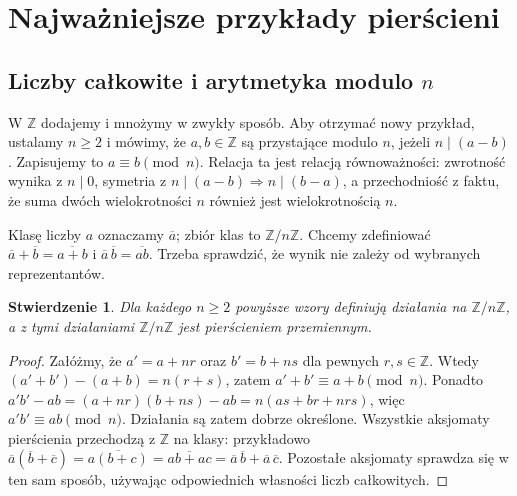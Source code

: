 \documentclass[11pt,a4paper,openany]{report}
\numberwithin{equation}{section}
\theoremstyle{plain}
\newtheorem{stwierdzenie}[twierdzenie]{Stwierdzenie}
\theoremstyle{definition}
\theoremstyle{remark}
\newcommand{\Z}{\mathbb Z}
\begin{document}
\section{Najważniejsze przykłady pierścieni}

\subsection{Liczby całkowite i arytmetyka modulo \texorpdfstring{$n$}{n}}

W $\Z$ dodajemy i mnożymy w zwykły sposób. Aby otrzymać nowy przykład,
ustalamy $n\ge2$ i mówimy, że $a,b\in\Z$ są przystające modulo $n$,
jeżeli $n\mid(a-b)$. Zapisujemy to $a\equiv b\pmod n$.
Relacja ta jest relacją równoważności: zwrotność wynika z $n\mid0$,
symetria z $n\mid(a-b)\Rightarrow n\mid(b-a)$,
a przechodniość z faktu, że suma dwóch wielokrotności $n$
również jest wielokrotnością $n$.

Klasę liczby $a$ oznaczamy $\overline a$; zbiór klas to $\Z/n\Z$.
Chcemy zdefiniować $\overline a+\overline b=\overline{a+b}$ i
$\overline a\,\overline b=\overline{ab}$. Trzeba sprawdzić,
że wynik nie zależy od wybranych reprezentantów.

\begin{stwierdzenie}
\label{st:modulo}
Dla każdego $n\ge2$ powyższe wzory definiują działania na $\Z/n\Z$,
a z tymi działaniami $\Z/n\Z$ jest pierścieniem przemiennym.
\end{stwierdzenie}
\begin{proof}
Załóżmy, że $a'=a+nr$ oraz $b'=b+ns$ dla pewnych $r,s\in\Z$.
Wtedy $(a'+b')-(a+b)=n(r+s)$, zatem $a'+b'\equiv a+b\pmod n$.
Ponadto
$a'b'-ab=(a+nr)(b+ns)-ab=n(as+br+nrs)$,
więc $a'b'\equiv ab\pmod n$. Działania są zatem dobrze określone.
Wszystkie aksjomaty pierścienia przechodzą z $\Z$ na klasy:
przykładowo $\overline a(\overline b+\overline c)
=\overline{a(b+c)}=\overline{ab+ac}
=\overline a\,\overline b+\overline a\,\overline c$.
Pozostałe aksjomaty sprawdza się w ten sam sposób, używając
odpowiednich własności liczb całkowitych.
\end{proof}
\end{document}
